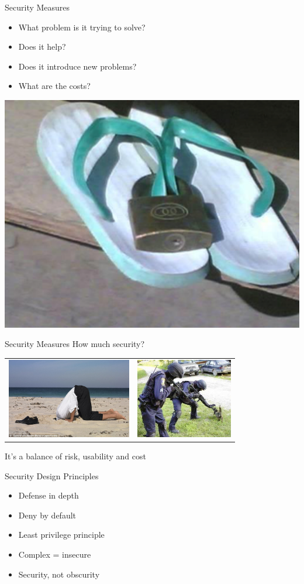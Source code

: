 \documentclass{beamer}
\begin{document}
\begin{frame}{Security Measures}
\begin{itemize}
 \item What problem is it trying to solve? 
 \item Does it help? 
 \item Does it introduce new problems? 
 \item What are the costs?
 \end{itemize} 
 \begin{center}
	\includegraphics[width=0.4\linewidth]{flipflops.png} 
 \end{center}
\end{frame}

\begin{frame}{Security Measures}
How much security?
\begin{tabular}{c c}
\includegraphics[height = 3.5cm]{ostrich.jpg}
& \includegraphics[height = 3.5cm]{cat.jpg}
\end{tabular}
\centering
It's a balance of risk, usability and cost 
\end{frame}

\begin{frame}{Security Design Principles}
  \begin{itemize}
    \item Defense in depth
    \item Deny by default
    \item Least privilege principle
    \item Complex = insecure
    \item Security, not obscurity
  \end{itemize}
\end{frame}
\end{document}
